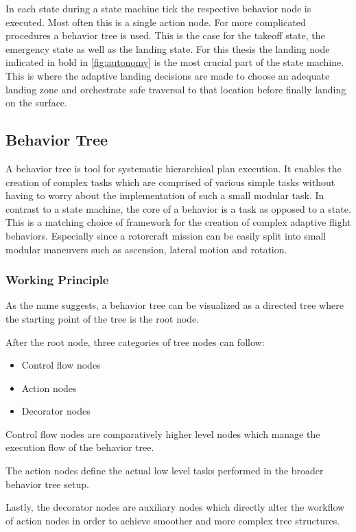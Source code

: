 In each state during a state machine tick the respective behavior node is executed. Most often this is a single action node. For more complicated procedures a behavior tree is used. This is the case for the takeoff state, the emergency state as well as the landing state. For this thesis the landing node indicated in bold in \cref{fig:autonomy} is the most crucial part of the state machine. This is where the adaptive landing decisions are made to choose an adequate landing zone and orchestrate safe traversal to that location before finally landing on the surface.

\subsection{Behavior Tree}\label{subsec:setup:behavior_tree}

A behavior tree is tool for systematic hierarchical plan execution. It enables the creation of complex tasks which are comprised of various simple tasks without having to worry about the implementation of such a small modular task. In contrast to a state machine, the core of a behavior is a task as opposed to a state. This is a matching choice of framework for the creation of complex adaptive flight behaviors. Especially since a rotorcraft mission can be easily split into small modular maneuvers such as ascension, lateral motion and rotation.

\subsubsection{Working Principle}
As the name suggests, a behavior tree can be visualized as a directed tree where the starting point of the tree is the root node. 

After the root node, three categories of tree nodes can follow:

\begin{itemize}
    \item Control flow nodes
    \item Action nodes
    \item Decorator nodes
    \end{itemize}
    
    Control flow nodes are comparatively higher level nodes which manage the execution flow of the behavior tree.
    
    The action nodes define the actual low level tasks performed in the broader behavior tree setup. 
    
    Lastly, the decorator nodes are auxiliary nodes which directly alter the workflow of action nodes in order to achieve smoother and more complex tree structures.
    
